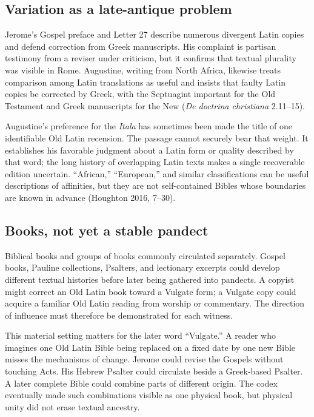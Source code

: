 \subsection{Variation as a late-antique problem}

Jerome's Gospel preface and Letter 27 describe numerous divergent Latin copies and defend correction from Greek manuscripts. His complaint is partisan testimony from a reviser under criticism, but it confirms that textual plurality was visible in Rome. Augustine, writing from North Africa, likewise treats comparison among Latin translations as useful and insists that faulty Latin copies be corrected by Greek, with the Septuagint important for the Old Testament and Greek manuscripts for the New (\emph{De doctrina christiana} 2.11--15).

Augustine's preference for the \emph{Itala} has sometimes been made the title of one identifiable Old Latin recension. The passage cannot securely bear that weight. It establishes his favorable judgment about a Latin form or quality described by that word; the long history of overlapping Latin texts makes a single recoverable edition uncertain. ``African,'' ``European,'' and similar classifications can be useful descriptions of affinities, but they are not self-contained Bibles whose boundaries are known in advance (Houghton 2016, 7--30).

\subsection{Books, not yet a stable pandect}

Biblical books and groups of books commonly circulated separately. Gospel books, Pauline collections, Psalters, and lectionary excerpts could develop different textual histories before later being gathered into pandects. A copyist might correct an Old Latin book toward a Vulgate form; a Vulgate copy could acquire a familiar Old Latin reading from worship or commentary. The direction of influence must therefore be demonstrated for each witness.

This material setting matters for the later word ``Vulgate.'' A reader who imagines one Old Latin Bible being replaced on a fixed date by one new Bible misses the mechanisms of change. Jerome could revise the Gospels without touching Acts. His Hebrew Psalter could circulate beside a Greek-based Psalter. A later complete Bible could combine parts of different origin. The codex eventually made such combinations visible as one physical book, but physical unity did not erase textual ancestry.

